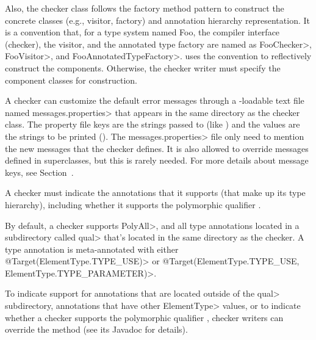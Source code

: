 Also, the checker class follows the factory method pattern to
construct the concrete classes (e.g., visitor, factory) and annotation
hierarchy representation.  It is a convention that, for
a type system named Foo, the compiler
interface (checker), the visitor, and the annotated type factory are
named as \<FooChecker>, \<FooVisitor>, and \<FooAnnotatedTypeFactory>.
 uses the convention to
reflectively construct the components.  Otherwise, the checker writer
must specify the component classes for construction.

\begin{sloppypar}
A checker can customize the default error messages through a
-loadable text file named
\<messages.properties> that appears in the same directory as the checker class.
The property file keys are the strings passed to 
(like ) and the values are the strings to be
printed ().
The \<messages.properties> file only need to mention the new messages that
the checker defines.
It is also allowed to override messages defined in superclasses, but this
is rarely needed.
For more details about message keys, see Section~.
\end{sloppypar}


A checker must indicate the annotations that it supports (that make up its type
hierarchy), including whether it supports the polymorphic qualifier
.

By default, a checker supports \<PolyAll>, and all type annotations located in a
subdirectory called \<qual> that's located in the same directory as the checker.
A type annotation is meta-annotated with either
\<@Target(ElementType.TYPE\_USE)>
or
\<@Target({ElementType.TYPE\_USE, ElementType.TYPE\_PARAMETER})>.

To indicate support for annotations that are located outside of the \<qual>
subdirectory, annotations that have other \<ElementType> values, or to indicate
whether a checker supports the polymorphic qualifier
, checker writers can override the
method (see its Javadoc for details).

